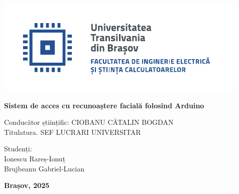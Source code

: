 \begin{titlepage}
	
	\vspace*{-3cm}
	\hspace{-2cm}
	\includegraphics[width=0.8\linewidth]{./images/Logo-UT-IESC-SPOT-RO}
		
		\vspace{2cm}
		\begin{center}
		\Huge\textbf{Sistem de acces cu recunoaștere
facială folosind Arduino}
        \end{center}
		
		\vfill
				
        \noindent\Large{Conducător științific: CIOBANU CĂTALIN BOGDAN}\hfill \\ 
        \Large{Titulatura. SEF LUCRARI UNIVERSITAR}\hfill \\
        \begin{center}
        \hfill\Large{Studenți:} \\
        \hfill\Large{Ionescu Rareș-Ionuț} \\
        \hfill\Large{Brujbeanu Gabriel-Lucian} \\
        
       
        \end{center}
		
		\vfill
		
		\Large
        \begin{center}
		\textbf{Brașov, 2025}
        \end{center}
        
\end{titlepage}